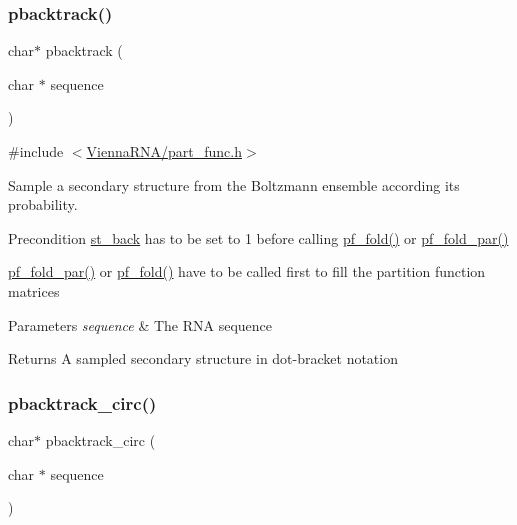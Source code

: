 \subsubsection{\texorpdfstring{pbacktrack()}{pbacktrack()}}
{\footnotesize\ttfamily char$\ast$ pbacktrack (\begin{DoxyParamCaption}\item[{char $\ast$}]{sequence }\end{DoxyParamCaption})}



{\ttfamily \#include $<$\hyperlink{part__func_8h}{Vienna\+R\+N\+A/part\+\_\+func.\+h}$>$}



Sample a secondary structure from the Boltzmann ensemble according its probability. 

\begin{DoxyPrecond}{Precondition}
\hyperlink{group__subopt__stochbt_gacd79b1a570e6ad9be24cb11fe8cae30a}{st\+\_\+back} has to be set to 1 before calling \hyperlink{group__part__func__global__deprecated_gadc3db3d98742427e7001a7fd36ef28c2}{pf\+\_\+fold()} or \hyperlink{group__part__func__global__deprecated_gac4f95bee734b2563a3d6e9932117ebdf}{pf\+\_\+fold\+\_\+par()} 

\hyperlink{group__part__func__global__deprecated_gac4f95bee734b2563a3d6e9932117ebdf}{pf\+\_\+fold\+\_\+par()} or \hyperlink{group__part__func__global__deprecated_gadc3db3d98742427e7001a7fd36ef28c2}{pf\+\_\+fold()} have to be called first to fill the partition function matrices
\end{DoxyPrecond}

\begin{DoxyParams}{Parameters}
{\em sequence} & The R\+NA sequence \\
\hline
\end{DoxyParams}
\begin{DoxyReturn}{Returns}
A sampled secondary structure in dot-\/bracket notation 
\end{DoxyReturn}
\mbox{\label{group__subopt__stochbt_ga00474051204ac9ad576b3e45174d03ff}} 
\subsubsection{\texorpdfstring{pbacktrack\+\_\+circ()}{pbacktrack\_circ()}}
{\footnotesize\ttfamily char$\ast$ pbacktrack\+\_\+circ (\begin{DoxyParamCaption}\item[{char $\ast$}]{sequence }\end{DoxyParamCaption})}



